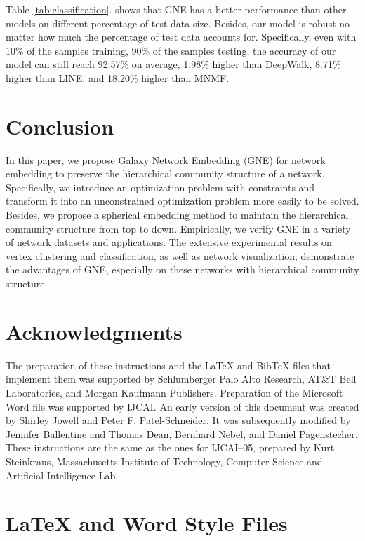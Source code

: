 \documentclass{article}
\theoremstyle{definition}
\begin{document}
	Table \ref{tab:classification}. shows that GNE has a better performance than other models on different percentage of test data size. Besides, our model is robust no matter how much the percentage of test data accounts for. Specifically, even with 10\% of the samples training, 90\% of the samples testing, the accuracy of our model can still reach 92.57\% on average, 1.98\% higher than DeepWalk, 8.71\% higher than LINE, and 18.20\% higher than MNMF.  
	
	
 
 
 	\section{Conclusion}
 	In this paper, we propose Galaxy Network Embedding (GNE) for network embedding to preserve the hierarchical community structure of a network. 
 	Specifically, we introduce an optimization problem with constraints and transform it into an unconstrained optimization problem more easily to be solved. Besides, we propose a spherical embedding method to maintain the hierarchical community structure from top to down. 
 	Empirically, we verify GNE in a variety of network datasets and applications. The extensive experimental results on vertex clustering and classification, as well as network visualization, demonstrate the advantages of GNE, especially on these networks with hierarchical community structure.
    
\section*{Acknowledgments}

The preparation of these instructions and the \LaTeX{} and Bib\TeX{}
files that implement them was supported by Schlumberger Palo Alto
Research, AT\&T Bell Laboratories, and Morgan Kaufmann Publishers.
Preparation of the Microsoft Word file was supported by IJCAI.  An
early version of this document was created by Shirley Jowell and Peter
F. Patel-Schneider.  It was subsequently modified by Jennifer
Ballentine and Thomas Dean, Bernhard Nebel, and Daniel Pagenstecher.
These instructions are the same as the ones for IJCAI--05, prepared by
Kurt Steinkraus, Massachusetts Institute of Technology, Computer
Science and Artificial Intelligence Lab.

\appendix

\section{\LaTeX{} and Word Style Files}\label{stylefiles}
\end{document}
